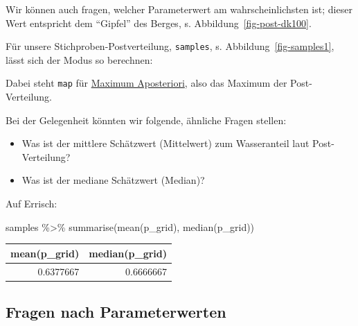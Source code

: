 \documentclass[
  a4paper,
  DIV=11]{scrreprt}
\newenvironment{Shaded}{\begin{snugshade}}{\end{snugshade}}
\newcommand{\DocumentationTok}[1]{\textcolor[rgb]{0.37,0.37,0.37}{\textit{#1}}}
\newcommand{\FunctionTok}[1]{\textcolor[rgb]{0.28,0.35,0.67}{#1}}
\newcommand{\NormalTok}[1]{\textcolor[rgb]{0.00,0.23,0.31}{#1}}
\newcommand{\SpecialCharTok}[1]{\textcolor[rgb]{0.37,0.37,0.37}{#1}}
\providecommand{\tightlist}{%
  \setlength{\itemsep}{0pt}\setlength{\parskip}{0pt}}\usepackage{longtable,booktabs,array}
\theoremstyle{definition}
\theoremstyle{remark}
\begin{document}
Wir können auch fragen, welcher Parameterwert am wahrscheinlichsten ist;
dieser Wert entspricht dem ``Gipfel'' des Berges, s.
Abbildung~\ref{fig-post-dk100}.

Für unsere Stichproben-Postverteilung, \texttt{samples}, s.
Abbildung~\ref{fig-samples1}, lässt sich der Modus so berechnen:

\begin{Shaded}
\end{Shaded}

Dabei steht \texttt{map} für
\href{https://easystats.github.io/bayestestR/reference/map_estimate.html}{Maximum
Aposteriori}, also das Maximum der Post-Verteilung.

Bei der Gelegenheit könnten wir folgende, ähnliche Fragen stellen:

\begin{itemize}
\tightlist
\item
  Was ist der mittlere Schätzwert (Mittelwert) zum Wasseranteil laut
  Post-Verteilung?
\item
  Was ist der mediane Schätzwert (Median)?
\end{itemize}

Auf Errisch:

\begin{Shaded}
\begin{Highlighting}[]
\NormalTok{samples }\SpecialCharTok{\%\textgreater{}\%} 
  \FunctionTok{summarise}\NormalTok{(}\FunctionTok{mean}\NormalTok{(p\_grid),}
            \FunctionTok{median}\NormalTok{(p\_grid))}
\end{Highlighting}
\end{Shaded}

\begin{longtable}[]{@{}rr@{}}
\toprule()
mean(p\_grid) & median(p\_grid) \\
\midrule()
\endhead
0.6377667 & 0.6666667 \\
\bottomrule()
\end{longtable}

\hypertarget{fragen-nach-parameterwerten}{%
\subsection{Fragen nach
Parameterwerten}\label{fragen-nach-parameterwerten}}
\end{document}
